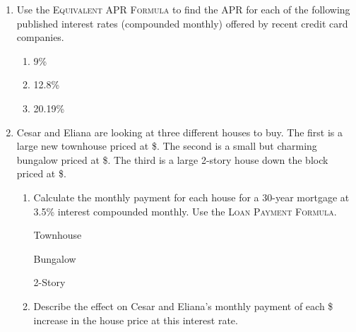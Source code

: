 \begin{enumerate}
\item Use the \textsc{Equivalent APR Formula} to find the APR for each of the following published interest rates (compounded monthly) offered by recent credit card companies.
\begin{enumerate}
\item 9\% \vfill
\item 12.8\%   \vfill
\item 20.19\% \vfill
\end{enumerate}

\newpage %

\item  Cesar and Eliana are looking at three different houses to buy.  The first is a large new townhouse priced at \$.  The second is a small but charming bungalow priced at \$.  The third is a large 2-story house down the block priced at \$. 
 \begin{enumerate}
\item Calculate the monthly payment for each house for a 30-year mortgage at 3.5\% interest compounded monthly.   Use the \textsc{Loan Payment Formula}. 
\bigskip

Townhouse \vfill

Bungalow \vfill

2-Story \vfill

\item Describe the effect on Cesar and Eliana's monthly payment of each \$ increase in the house price  at this interest rate. \vfill
\end{enumerate}

\end{enumerate}



